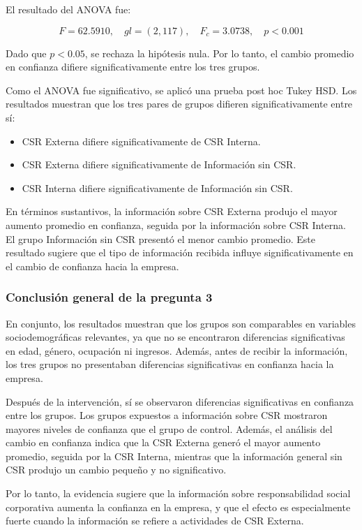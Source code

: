\documentclass[12pt,letterpaper]{article}
\begin{document}
El resultado del ANOVA fue:

\[
F = 62.5910,\quad gl = (2,117),\quad F_c = 3.0738,\quad p < 0.001
\]

Dado que \(p < 0.05\), se rechaza la hipótesis nula. Por lo tanto, el cambio promedio en confianza difiere significativamente entre los tres grupos.

Como el ANOVA fue significativo, se aplicó una prueba post hoc Tukey HSD. Los resultados muestran que los tres pares de grupos difieren significativamente entre sí:

\begin{itemize}
    \item CSR Externa difiere significativamente de CSR Interna.
    \item CSR Externa difiere significativamente de Información sin CSR.
    \item CSR Interna difiere significativamente de Información sin CSR.
\end{itemize}

En términos sustantivos, la información sobre CSR Externa produjo el mayor aumento promedio en confianza, seguida por la información sobre CSR Interna. El grupo Información sin CSR presentó el menor cambio promedio. Este resultado sugiere que el tipo de información recibida influye significativamente en el cambio de confianza hacia la empresa.

\subsubsection*{Conclusión general de la pregunta 3}

En conjunto, los resultados muestran que los grupos son comparables en variables sociodemográficas relevantes, ya que no se encontraron diferencias significativas en edad, género, ocupación ni ingresos. Además, antes de recibir la información, los tres grupos no presentaban diferencias significativas en confianza hacia la empresa.

Después de la intervención, sí se observaron diferencias significativas en confianza entre los grupos. Los grupos expuestos a información sobre CSR mostraron mayores niveles de confianza que el grupo de control. Además, el análisis del cambio en confianza indica que la CSR Externa generó el mayor aumento promedio, seguida por la CSR Interna, mientras que la información general sin CSR produjo un cambio pequeño y no significativo.

Por lo tanto, la evidencia sugiere que la información sobre responsabilidad social corporativa aumenta la confianza en la empresa, y que el efecto es especialmente fuerte cuando la información se refiere a actividades de CSR Externa.
\end{document}
